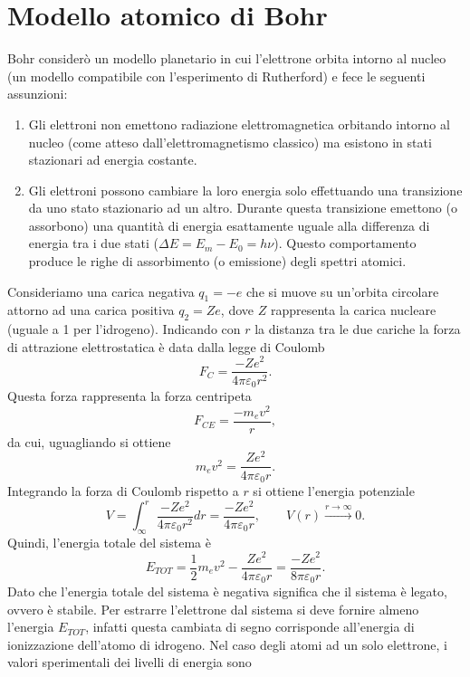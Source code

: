 \section{Modello atomico di Bohr}
Bohr considerò un modello planetario in cui l'elettrone orbita intorno al nucleo (un modello compatibile con l'esperimento di Rutherford) e fece le seguenti assunzioni:
\begin{enumerate}
    \item Gli elettroni non emettono radiazione elettromagnetica orbitando intorno al nucleo (come atteso dall'elettromagnetismo classico) ma esistono in stati stazionari ad energia costante.
    \item Gli elettroni possono cambiare la loro energia solo effettuando una transizione da uno stato stazionario ad un altro. Durante questa transizione emettono (o assorbono) una quantità di energia esattamente uguale alla differenza di energia tra i due stati ($\Delta E=E_m-E_0=h\nu$). Questo comportamento produce le righe di assorbimento (o emissione) degli spettri atomici.
\end{enumerate}
Consideriamo una carica negativa $q_1=-e$ che si muove su un'orbita circolare attorno ad una carica positiva $q_2=Ze$, dove $Z$ rappresenta la carica nucleare (uguale a 1 per l'idrogeno). Indicando con $r$ la distanza tra le due cariche la forza di attrazione elettrostatica è data dalla legge di Coulomb
\begin{equation}
    F_C=\frac{-Ze^2}{4\pi\varepsilon_0r^2}.
\end{equation}
Questa forza rappresenta la forza centripeta
\begin{equation}
    F_{CE}=\frac{-m_ev^2}{r},
\end{equation}
da cui, uguagliando si ottiene
\begin{equation}
    m_ev^2=\frac{Ze^2}{4\pi\varepsilon_0r}.
\end{equation}
Integrando la forza di Coulomb rispetto a $r$ si ottiene l'energia potenziale 
\begin{equation}
    V=\int_{\infty}^{r}\frac{-Ze^2}{4\pi\varepsilon_0r^2}dr=\frac{-Ze^2}{4\pi\varepsilon_0r},\qquad V(r)\xrightarrow{r\to\infty}0.
\end{equation}
Quindi, l'energia totale del sistema è 
\begin{equation}
    E_{TOT}=\frac{1}{2}m_ev^2-\frac{Ze^2}{4\pi\varepsilon_0r}=\frac{-Ze^2}{8\pi\varepsilon_0r}.
\end{equation}
Dato che l'energia totale del sistema è negativa significa che il sistema è legato, ovvero è stabile. Per estrarre l'elettrone dal sistema si deve fornire almeno l'energia $E_{TOT}$, infatti questa cambiata di segno corrisponde all'energia di ionizzazione dell'atomo di idrogeno. Nel caso degli atomi ad un solo elettrone, i valori sperimentali dei livelli di energia sono
